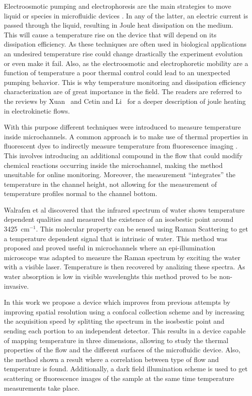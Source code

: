 \documentclass[]{spie}  %
\begin{document}
Electroosmotic pumping and electrophoresis are the main strategies to move liquid or species in microfluidic devices  \cite{hunter2001,lyklema1995}. In any of the latter, an electric current is passed through the liquid, resulting in Joule heat dissipation on the medium. This will cause a temperature rise on the device that will depend on its dissipation efficiency. As these techniques are often used in biological applications \cite{tian2008} an undesired temperature rise could change drastically the experiment evolution or even make it fail. Also, as the electroosmotic and electrophoretic mobility are a function of temperature \cite{tang2006} a poor thermal control could lead to an unexpected pumping behavior. This is why temperature monitoring and dissipation efficiency characterization are of great importance in the field. The readers are referred to the reviews by Xuan~\cite{xuan2008} and Cetin and Li~\cite{cetin2008} for a deeper description of joule heating in electrokinetic flows. 

With this purpose different techniques were introduced to measure temperature inside microchannels. A common approach is to make use of thermal properties in fluorescent dyes to indirectly measure temperature from fluorescence imaging \cite{tang2006,ross2001,erickson2003,dye1,dye2}. This involves introducing an additional compound in the flow that could modify chemical reactions occurring inside the microchannel, making the method unsuitable for online monitoring. Moreover, the measurement ``integrates'' the temperature in the channel height, not allowing for the measurement of temperature profiles normal to the channel bottom. 

Walrafen et al \cite{walrafen1} discovered that the infrared spectrum of water shows temperature dependent qualities and measured the existence of an isosbestic point around 3425~$\mathrm{cm^{-1}}$. This molecular property can be sensed using Raman Scattering to get a temperature dependent signal that is intrinsic of water. This method was proposed and proved useful in microchannels \cite{raman1,raman2,raman3} where an epi-illumination microscope was adapted to measure the Raman spectrum by exciting the water with a visible laser. Temperature is then recovered by analizing these spectra. As water absorption is low in visible wavelenghts \cite{absorption} this method proved to be non-invasive.

In this work we propose a device which improves from previous attempts by improving spatial resolution using a confocal collection scheme and by increasing the acquisition speed by splitting the spectrum in the isosbestic point and sending each portion to an independent detector. This results in a device capable of mapping temperature in three dimensions, allowing to study the thermal properties of the flow and the different surfaces of the microfluidic device. Also, the method shown a result where a correlation between type of flow and temperature is found. Additionally, a dark field illumination scheme is used to get scattering or fluorescence images of the sample at the same time temperature measurements take place.
\end{document}
